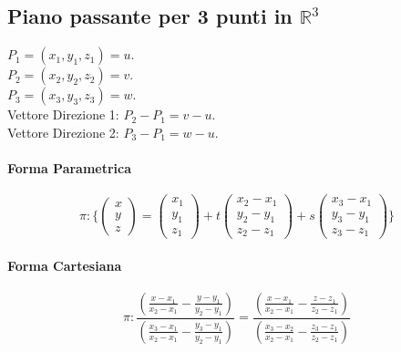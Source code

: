 \documentclass{article}
\begin{document}
\subsection{Piano passante per 3 punti in $\mathbb{R}^3$}

$P_1 = (x_1, y_1, z_1) = u$. \\
$P_2 = (x_2, y_2, z_2) = v$. \\
$P_3 = (x_3, y_3, z_3) = w$. \\
Vettore Direzione 1: $P_2 - P_1 = v - u$. \\
Vettore Direzione 2: $P_3 - P_1 = w - u$.

\paragraph{Forma Parametrica}

\begin{equation*}
    \pi : \{
    \begin{pmatrix}
        x \\
        y \\
        z
    \end{pmatrix} =
    \begin{pmatrix}
        x_1 \\
        y_1 \\
        z_1
    \end{pmatrix} + t
    \begin{pmatrix}
        x_2 - x_1 \\
        y_2 - y_1 \\
        z_2 - z_1
    \end{pmatrix} + s
    \begin{pmatrix}
        x_3 - x_1 \\
        y_3 - y_1 \\
        z_3 - z_1
    \end{pmatrix}
    \}
\end{equation*}

\paragraph{Forma Cartesiana}

\begin{equation*}
    \pi : \frac{(\frac{x - x_1}{x_2 - x_1} - \frac{y - y_1}{y_2 - y_1})}{(\frac{x_3 - x_1}{x_2 - x_1} - \frac{y_3 - y_1}{y_2 - y_1})} = \frac{(\frac{x - x_1}{x_2 - x_1} - \frac{z - z_1}{z_2 - z_1})}{(\frac{x_3 - x_2}{x_2 - x_1} - \frac{z_3 - z_1}{z_2 - z_1})}
\end{equation*}
\end{document}
